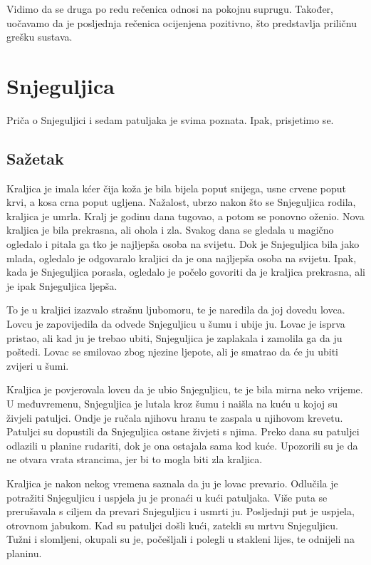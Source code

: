 \documentclass[a4paper,twoside,12pt]{memoir} %
\begin{document}
		Vidimo da se druga po redu rečenica odnosi na pokojnu suprugu. Također, uočavamo da je posljednja rečenica ocijenjena pozitivno, što predstavlja priličnu grešku sustava.


	\section{Snjeguljica}

		Priča o Snjeguljici i sedam patuljaka je svima poznata. Ipak, prisjetimo se.

		\subsection{Sažetak}

		Kraljica je imala kćer čija koža je bila bijela poput snijega, usne crvene poput krvi, a kosa crna poput ugljena. Nažalost, ubrzo nakon što se Snjeguljica rodila, kraljica je umrla. Kralj je godinu dana tugovao, a potom se ponovno oženio. Nova kraljica je bila prekrasna, ali ohola i zla. Svakog dana se gledala u magično ogledalo i pitala ga tko je najljepša osoba na svijetu. Dok je Snjeguljica bila jako mlada, ogledalo je odgovaralo kraljici da je ona najljepša osoba na svijetu. Ipak, kada je Snjeguljica porasla, ogledalo je počelo govoriti da je kraljica prekrasna, ali je ipak Snjeguljica ljepša.

		To je u kraljici izazvalo strašnu ljubomoru, te je naredila da joj dovedu lovca. Lovcu je zapovijedila da odvede Snjeguljicu u šumu i ubije ju. Lovac je isprva pristao, ali kad ju je trebao ubiti, Snjeguljica je zaplakala i zamolila ga da ju poštedi. Lovac se smilovao zbog njezine ljepote, ali je smatrao da će ju ubiti zvijeri u šumi.

		Kraljica je povjerovala lovcu da je ubio Snjeguljicu, te je bila mirna neko vrijeme.
		U međuvremenu, Snjeguljica je lutala kroz šumu i naišla na kuću u kojoj su živjeli patuljci. Ondje je ručala njihovu hranu te zaspala u njihovom krevetu. Patuljci su dopustili da Snjeguljica ostane živjeti s njima. Preko dana su patuljci odlazili u planine rudariti, dok je ona ostajala sama kod kuće. Upozorili su je da ne otvara vrata strancima, jer bi to mogla biti zla kraljica.

		Kraljica je nakon nekog vremena saznala da ju je lovac prevario. Odlučila je potražiti Snjeguljicu i uspjela ju je pronaći u kući patuljaka. Više puta se prerušavala s ciljem da prevari Snjeguljicu i usmrti ju. Posljednji put je uspjela, otrovnom jabukom. Kad su patuljci došli kući, zatekli su mrtvu Snjeguljicu. Tužni i slomljeni, okupali su je, počešljali i polegli u stakleni lijes, te odnijeli na planinu.
\end{document}
